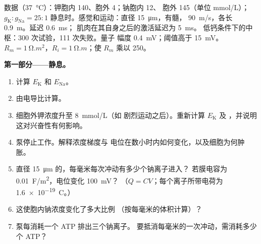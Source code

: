 \begin{problem}
\label{pb:b2:neurons-synapses:1}
数据（\qty{37}{\celsius}）：钾胞内 140、胞外 4；钠胞内 12、
胞外 145（单位 \unit{mmol/L}）；$g_{\mathrm K} : g_{\mathrm{Na}} = 25 : 1$
静息时。感觉和运动：直径 \qty{15}{\micro m}，有髓，
 \qty{90}{m/s}，各长 \qty{0.9}{m}。延迟 \qty{0.6}{ms}；
肌肉在其自身之后的激活延迟为 \qty{5}{ms}。
低钙条件下的中枢：300 次试验，111 次失败。量子
幅度 \qty{0.4}{mV}；阈值高于 \qty{15}{mV}。$R_m =
\qty{1}{\ohm.m^2}$，$R_i = \qty{1}{\ohm.m}$；使 $R_m$
乘以 250。

\medskip
\noindent\textbf{第一部分——静息。}
\begin{enumerate}
  \item 计算 $E_{\mathrm K}$ 和 $E_{\mathrm{Na}}$。
  \item 由电导比计算。
  \item 细胞外钾浓度升至 \qty{8}{mmol/L}（如
        剧烈运动之后）。重新计算 $E_{\mathrm K}$ 及
        ，并说明这对兴奋性有何影响。
  \item 泵停止工作。解释浓度梯度与
        电位在数小时内如何变化，以及细胞为何肿胀。
  \item 直径 \qty{15}{\micro m} 的，每毫米每次冲动有多少个钠离子进入？
        若膜电容为
        \qty{0.01}{F/m^2}，电位变化 \qty{100}{mV}？
        （$Q = CV$；每个离子所带电荷为 \qty{1.6e-19}{C}。）
  \item 这使胞内钠浓度变化了多大比例
        （按每毫米的体积计算）？
  \item 泵每消耗一个 ATP 排出三个钠离子。
        要抵消每毫米的一次冲动，需消耗多少个 ATP？
\end{enumerate}


\end{problem}
